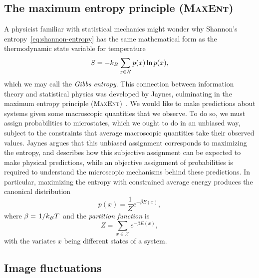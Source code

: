 \documentclass[aps,reprint]{revtex4-2}
\renewcommand\mathrm\textnormal%
\theoremstyle{plain}
\theoremstyle{definition}
\renewcommand\ln{\operatorname{\mathrm{ln}}}
\begin{document}
\subsection{The maximum entropy principle (\textsc{MaxEnt})}\label{sec:maxent}

A physicist familiar with statistical mechanics might wonder why Shannon's
entropy~\eqref{eq:shannon-entropy} has the same mathematical form as the
thermodynamic state variable for temperature
\begin{equation}
  S
  = -k_B \sum_{x \in \mathcal{X}} p(x) \ln p(x),
  \label{eq:gibbs-entropy}
\end{equation}
which we may call the \emph{Gibbs entropy}. This connection between information
theory and statistical physics was developed by Jaynes, culminating in the
maximum entropy principle (\textsc{MaxEnt})~\cite{jaynes1957information}. We
would like to make predictions about systems given some macroscopic quantities
that we observe. To do so, we must assign probabilities to microstates, which we
ought to do in an unbiased way, subject to the constraints that average
macroscopic quantities take their observed values. Jaynes argues that this
unbiased assignment corresponds to maximizing the entropy, and describes how
this subjective assignment can be expected to make physical predictions, while
an objective assignment of probabilities is required to understand the
microscopic mechanisms behind these predictions. In particular, maximizing the
entropy with constrained average energy produces the canonical
distribution~\cite{jaynes1957information}
\[
  p(x)
  = \frac{1}{Z}e^{-\beta E(x)},
\]
where $\beta = \flatfrac{1}{k_B T}$ and the \emph{partition function} is
\[
  Z
  = \sum_{x \in \mathcal{X}} e^{-\beta E(x)},
\]
with the variates $x$ being different states of a system.

\subsection{Image fluctuations}
\end{document}
